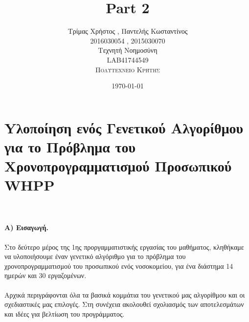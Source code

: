\documentclass[12pt]{article}
\title{Part 2} %
\author{Τρίμας Χρήστος , Παντελής Κωσταντίνος\\%
2016030054 , 2015030070 \\Τεχνητή Νοημοσύνη\\
LAB41744549\\%
\textsc{Πολυτεχνείο Κρήτης}
}
\date{\today} %
\begin{document}
\setlength{\droptitle}{-5em}    
\maketitle

\section*{Yλοποίηση ενός Γενετικού Αλγορίθμου για το Πρόβλημα του
Χρονοπρογραμματισμού Προσωπικού WHPP}
{\bfseries \\\\Α) Εισαγωγή.}
\\\\Στο δεύτερο μέρος της 1ης προργαμματιστικής εργασίας του μαθήματος, κληθήκαμε να υλοποιήσουμε έναν γενετικό αλγόριθμο για το πρόβλημα του χρονοπρογραμματισμού του προσωπικού ενός νοσοκομείου, για ένα διάστημα 14 ημερών και 30 εργαζομένων.\\\\ Αρχικά περιγράφονται όλα τα βασικά κομμάτια του γενετικού μας αλγορίθμου και οι σχεδιαστικές μας επιλογές. Στη συνέχεια ακολουθεί σχολιασμός των αποτελεσμάτων και ιδέες για βελτίωση του προγράμματος.\\\\
\end{document}
